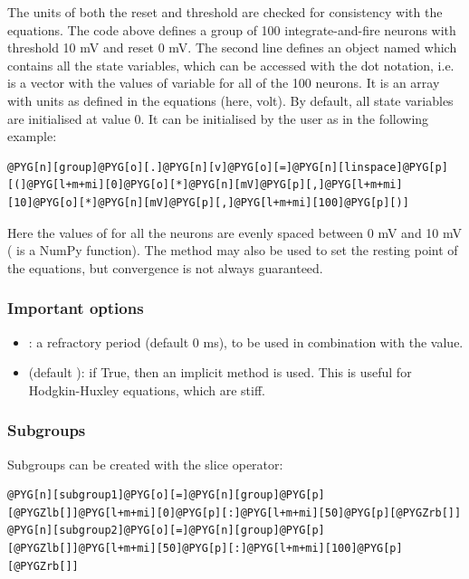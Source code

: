 \documentclass[letterpaper,10pt,english]{manual}
\begin{document}
The units of both the reset and threshold are checked for consistency with the equations.
The code above defines a group of 100 integrate-and-fire neurons with threshold 10 mV and
reset 0 mV. The second line defines an object named  which contains all the state
variables, which can be accessed with the dot notation, i.e.  is a vector with
the values of variable  for all of the 100 neurons. It is an array with units as defined
in the equations (here, volt). By default, all state variables are initialised at value 0.
It can be initialised by the user as in the following example:

\begin{Verbatim}[commandchars=@\[\]]
@PYG[n][group]@PYG[o][.]@PYG[n][v]@PYG[o][=]@PYG[n][linspace]@PYG[p][(]@PYG[l+m+mi][0]@PYG[o][*]@PYG[n][mV]@PYG[p][,]@PYG[l+m+mi][10]@PYG[o][*]@PYG[n][mV]@PYG[p][,]@PYG[l+m+mi][100]@PYG[p][)]
\end{Verbatim}

Here the values of  for all the neurons are evenly spaced between 0 mV and 10 mV
( is a NumPy function). The method  may also be used to set the
resting point of the equations, but convergence is not always guaranteed.


\subsubsection{Important options}
\begin{itemize}
\item {} 
: a refractory period (default 0 ms), to be used in combination with the  value.

\item {} 
 (default ): if True, then an implicit method is used. This is useful
for Hodgkin-Huxley equations, which are stiff.

\end{itemize}


\subsubsection{Subgroups}

Subgroups can be created with the slice operator:

\begin{Verbatim}[commandchars=@\[\]]
@PYG[n][subgroup1]@PYG[o][=]@PYG[n][group]@PYG[p][@PYGZlb[]]@PYG[l+m+mi][0]@PYG[p][:]@PYG[l+m+mi][50]@PYG[p][@PYGZrb[]]
@PYG[n][subgroup2]@PYG[o][=]@PYG[n][group]@PYG[p][@PYGZlb[]]@PYG[l+m+mi][50]@PYG[p][:]@PYG[l+m+mi][100]@PYG[p][@PYGZrb[]]
\end{Verbatim}
\end{document}
